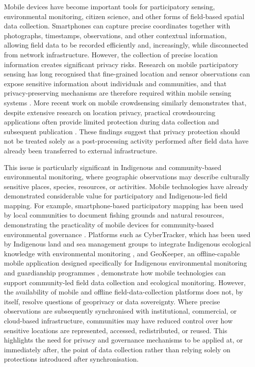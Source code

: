 \documentclass[a4paper,UKenglish,cleveref,autoref,thm-restate]{lipics-v2021}
\begin{document}
Mobile devices have become important tools for participatory sensing, environmental monitoring, citizen science, and other forms of field-based spatial data collection. Smartphones can capture precise coordinates together with photographs, timestamps, observations, and other contextual information, allowing field data to be recorded efficiently and, increasingly, while disconnected from network infrastructure. However, the collection of precise location information creates significant privacy risks. Research on mobile participatory sensing has long recognised that fine-grained location and sensor observations can expose sensitive information about individuals and communities, and that privacy-preserving mechanisms are therefore required within mobile sensing systems \citep{christin2011survey,christin2016privacy}. More recent work on mobile crowdsensing similarly demonstrates that, despite extensive research on location privacy, practical crowdsourcing applications often provide limited protection during data collection and subsequent publication \citep{boukoros2019lack,kim2022privacy}. These findings suggest that privacy protection should not be treated solely as a post-processing activity performed after field data have already been transferred to external infrastructure.

This issue is particularly significant in Indigenous and community-based environmental monitoring, where geographic observations may describe culturally sensitive places, species, resources, or activities. Mobile technologies have already demonstrated considerable value for participatory and Indigenous-led field mapping. For example, smartphone-based participatory mapping has been used by local communities to document fishing grounds and natural resources, demonstrating the practicality of mobile devices for community-based environmental governance \citep{paul2016piloting}. Platforms such as CyberTracker, which has been used by Indigenous land and sea management groups to integrate Indigenous ecological knowledge with environmental monitoring \citep{ens2012cybertracker}, and GeoKeeper, an offline-capable mobile application designed specifically for Indigenous environmental monitoring and guardianship programmes \citep{kwusen2024geokeeper}, demonstrate how mobile technologies can support community-led field data collection and ecological monitoring. However, the availability of mobile and offline field-data-collection platforms does not, by itself, resolve questions of geoprivacy or data sovereignty. Where precise observations are subsequently synchronised with institutional, commercial, or cloud-based infrastructure, communities may have reduced control over how sensitive locations are represented, accessed, redistributed, or reused. This highlights the need for privacy and governance mechanisms to be applied at, or immediately after, the point of data collection rather than relying solely on protections introduced after synchronisation.
\end{document}
